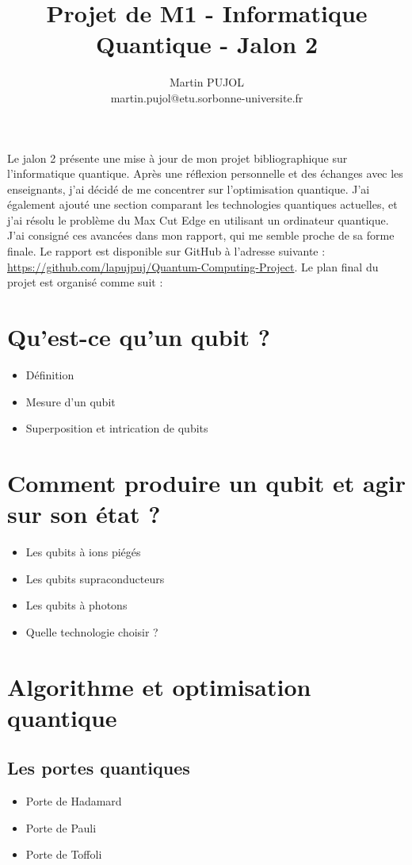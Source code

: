 \documentclass[12pt]{article}
\begin{document}
\title{Projet de M1 - Informatique Quantique - Jalon 2}
\author{Martin PUJOL \\ martin.pujol@etu.sorbonne-universite.fr}
\date{}
\maketitle
Le jalon 2 présente une mise à jour de mon projet bibliographique sur l'informatique quantique. Après une réflexion personnelle et des échanges avec les enseignants, j'ai décidé de me concentrer sur l'optimisation quantique. J'ai également ajouté une section comparant les technologies quantiques actuelles, et j'ai résolu le problème du Max Cut Edge en utilisant un ordinateur quantique. J'ai consigné ces avancées dans mon rapport, qui me semble proche de sa forme finale. Le rapport est disponible sur GitHub à l'adresse suivante : \url{https://github.com/lapujpuj/Quantum-Computing-Project}.
Le plan final du projet est organisé comme suit :

\section{Qu’est-ce qu’un qubit ?}
\begin{itemize}
    \item Définition
    \item Mesure d’un qubit
    \item Superposition et intrication de qubits
\end{itemize}

\section{Comment produire un qubit et agir sur son état ?}
\begin{itemize}
    \item Les qubits à ions piégés
    \item Les qubits supraconducteurs
    \item Les qubits à photons
    \item Quelle technologie choisir ?
\end{itemize}


\section{Algorithme et optimisation quantique}
\subsection{Les portes quantiques}
\begin{itemize}
    \item Porte de Hadamard
    \item Porte de Pauli
    \item Porte de Toffoli
\end{itemize}
\end{document}
